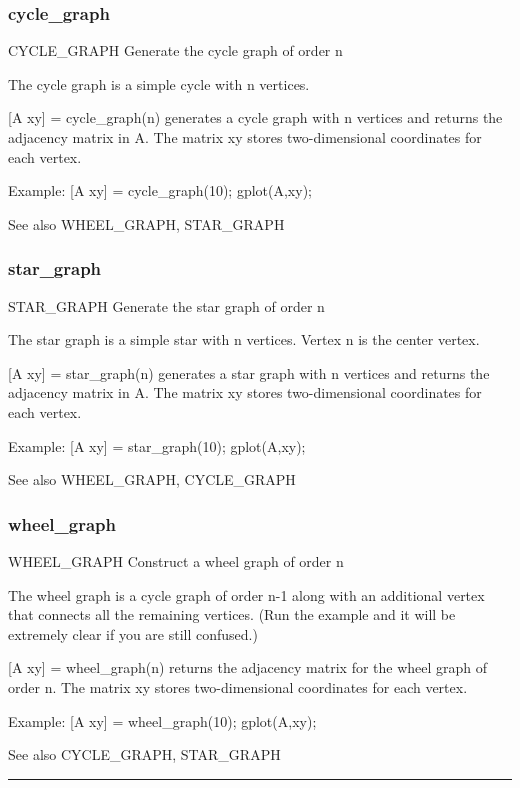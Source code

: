 \subsubsection*{cycle\_graph}
\begin{mcode}
  CYCLE_GRAPH Generate the cycle graph of order n
 
  The cycle graph is a simple cycle with n vertices.
 
  [A xy] = cycle_graph(n) generates a cycle graph with n vertices and
  returns the adjacency matrix in A.  The matrix xy stores two-dimensional 
  coordinates for each vertex.
 
  Example:
    [A xy] = cycle_graph(10);
    gplot(A,xy);
 
  See also WHEEL_GRAPH, STAR_GRAPH
\end{mcode}
\newpage
\subsubsection*{star\_graph}
\begin{mcode}
  STAR_GRAPH Generate the star graph of order n
 
  The star graph is a simple star with n vertices.  Vertex n is the center
  vertex.
 
  [A xy] = star_graph(n) generates a star graph with n vertices and
  returns the adjacency matrix in A.  The matrix xy stores two-dimensional 
  coordinates for each vertex.
 
  Example:
    [A xy] = star_graph(10);
    gplot(A,xy);
 
  See also WHEEL_GRAPH, CYCLE_GRAPH
\end{mcode}
\newpage
\subsubsection*{wheel\_graph}
\begin{mcode}
  WHEEL_GRAPH Construct a wheel graph of order n
 
  The wheel graph is a cycle graph of order n-1 along with an additional
  vertex that connects all the remaining vertices.  (Run the example and it
  will be extremely clear if you are still confused.)
 
  [A xy] = wheel_graph(n) returns the adjacency matrix for the wheel graph
  of order n.  The matrix xy stores two-dimensional coordinates for each 
  vertex.
 
  Example:
    [A xy] = wheel_graph(10);
    gplot(A,xy);
 
  See also CYCLE_GRAPH, STAR_GRAPH
\end{mcode}
\newpage
\hrule
